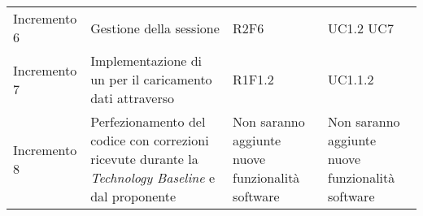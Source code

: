 \begin{longtable}{C{3cm} C{7cm} C{2cm} C{2cm}}
Incremento 6 & 
Gestione della sessione & 
R2F6 & 
UC1.2 \newline UC7\\
Incremento 7 & 
Implementazione di un  per il caricamento dati attraverso  & 
R1F1.2 & 
UC1.1.2\\
Incremento 8 & 
Perfezionamento del codice con correzioni ricevute durante la \textit{Technology Baseline} e dal proponente & 
Non saranno aggiunte nuove funzionalità software & 
Non saranno aggiunte nuove funzionalità software\\

\end{longtable}
